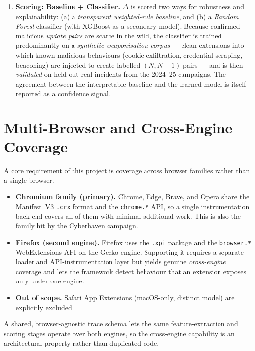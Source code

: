 \documentclass[11pt]{article}
\newcommand{\dem}[1]{\textbf{#1}}
\begin{document}
\begin{enumerate}[leftmargin=1.4em,itemsep=0.3em]
\item \dem{Scoring: Baseline + Classifier.} $\Delta$ is scored two ways for robustness and
explainability: (a) a \emph{transparent weighted-rule baseline}, and (b) a \emph{Random Forest}
classifier (with XGBoost as a secondary model). Because confirmed malicious \emph{update pairs} are
scarce in the wild, the classifier is trained predominantly on a \emph{synthetic weaponisation
corpus} --- clean extensions into which known malicious behaviours (cookie exfiltration, credential
scraping, beaconing) are injected to create labelled $(N, N{+}1)$ pairs --- and is then
\emph{validated} on held-out real incidents from the 2024--25 campaigns. The agreement between the
interpretable baseline and the learned model is itself reported as a confidence signal.
\end{enumerate}

\section{Multi-Browser and Cross-Engine Coverage}
A core requirement of this project is coverage across browser families rather than a single browser.

\begin{itemize}[leftmargin=1.4em,itemsep=0.2em]
\item \dem{Chromium family (primary).} Chrome, Edge, Brave, and Opera share the Manifest~V3
\texttt{.crx} format and the \texttt{chrome.*} API, so a single instrumentation back-end covers all
of them with minimal additional work. This is also the family hit by the Cyberhaven campaign.
\item \dem{Firefox (second engine).} Firefox uses the \texttt{.xpi} package and the \texttt{browser.*}
WebExtensions API on the Gecko engine. Supporting it requires a separate loader and API-instrumentation
layer but yields genuine \emph{cross-engine} coverage and lets the framework detect behaviour that an
extension exposes only under one engine.
\item \dem{Out of scope.} Safari App Extensions (macOS-only, distinct model) are explicitly excluded.
\end{itemize}

A shared, browser-agnostic trace schema lets the same feature-extraction and scoring stages operate
over both engines, so the cross-engine capability is an architectural property rather than duplicated
code.
\end{document}
